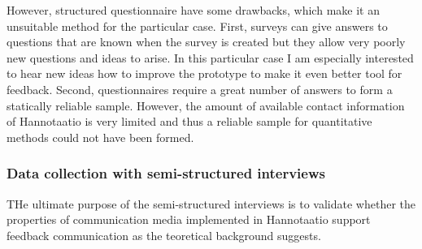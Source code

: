 \documentclass[english,12pt,a4paper,pdftex]{article}
\begin{document}
However, structured questionnaire have some drawbacks, which make it an unsuitable method for the particular case. First, surveys can give answers to questions that are known when the survey is created but they allow very poorly new questions and ideas to arise. In this particular case I am especially interested to hear new ideas how to improve the prototype to make it even better tool for feedback. Second, questionnaires require a great number of answers to form a statically reliable sample. However, the amount of available contact information of Hannotaatio is very limited and thus a reliable sample for quantitative methods could not have been formed.

\subsubsection{Data collection with semi-structured interviews}

THe ultimate purpose of the semi-structured interviews is to validate whether the properties of communication media implemented in Hannotaatio support feedback communication as the teoretical background suggests. 

\citep{silverman2009doing}

\end{document}
